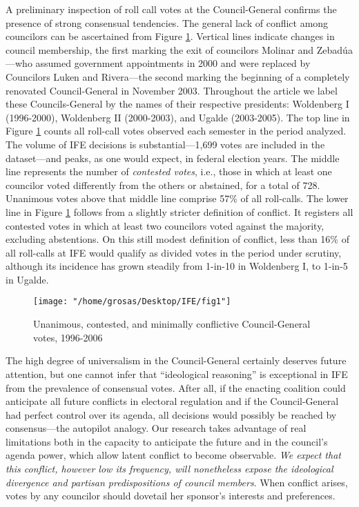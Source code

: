 \documentclass[12 pt, letter]{article}
\newcommand{\condcomment}[2]{\ifthenelse{#1}{#2}{}}
\begin{document}
A preliminary inspection of roll call votes at the Council-General confirms the presence of strong consensual tendencies.  The general lack of conflict among councilors can be ascertained from Figure \ref{F:unan}.  Vertical lines indicate changes in council membership, the first marking the exit of councilors Molinar and Zebad\'ua---who assumed government appointments in 2000 and were replaced by Councilors Luken and Rivera---the second marking the beginning of a completely renovated Council-General in November 2003.  Throughout the article we label these Councils-General by the names of their respective presidents: Woldenberg I (1996-2000), Woldenberg II (2000-2003), and Ugalde (2003-2005).  The top line in Figure \ref{F:unan} counts all roll-call votes observed each semester in the period analyzed.  The volume of IFE decisions is substantial---1,699 votes are included in the dataset---and peaks, as one would expect, in federal election years.  The middle line represents the number of \emph{contested votes}, i.e., those in which at least one councilor voted differently from the others or abstained, for a total of 728.  Unanimous votes above that middle line comprise 57\% of all roll-calls. The lower line in Figure \ref{F:unan} follows from a slightly stricter definition of conflict.  It registers all contested votes in which at least two councilors voted against the majority, excluding abstentions.  On this still modest definition of conflict, less than 16\% of all roll-calls at IFE would qualify as divided votes in the period under scrutiny, although its incidence has grown steadily from 1-in-10 in Woldenberg I, to 1-in-5 in Ugalde.

\begin{figure}
\begin{center}
\texttt{[image: "/home/grosas/Desktop/IFE/fig1"]}
\caption{Unanimous, contested, and minimally conflictive
Council-General votes, 1996-2006}\label{F:unan}
\end{center}
\end{figure}

The high degree of universalism in the Council-General certainly
deserves future attention, but one cannot infer that ``ideological
reasoning'' is exceptional in IFE from the prevalence of consensual
votes.  After all, if the enacting coalition could anticipate all
future conflicts in electoral regulation and if the Council-General
had perfect control over its agenda, all decisions would possibly be
reached by consensus---the autopilot analogy.  Our research takes
advantage of real limitations both in the capacity to anticipate the
future and in the council's agenda power, which allow latent
conflict to become observable.  \emph{We expect that this conflict,
however low its frequency, will nonetheless expose the ideological
divergence and partisan predispositions of council members}.  When
conflict arises, votes by any councilor should dovetail her
sponsor's interests and preferences.
\end{document}
